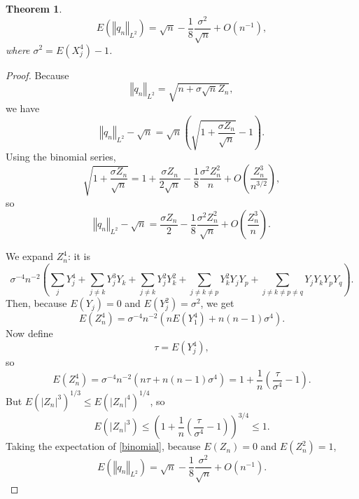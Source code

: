 \documentclass{amsart}
\newcommand{\norm}[1]{\left\Vert #1 \right\Vert}
\newtheorem{theorem}{Theorem}
\begin{document}
\begin{theorem}
\[
E(\norm{q_n}_{L^2}) = \sqrt{n} - \frac{1}{8} \frac{\sigma^2}{\sqrt{n}} + O(n^{-1}),
\]
where $\sigma^2 = E(X_j^4) - 1$.
\end{theorem}
\begin{proof}
Because 
\[
\norm{q_n}_{L^2} = \sqrt{n+\sigma \sqrt{n} Z_n},
\]
we have
\[
\norm{q_n}_{L^2} - \sqrt{n} = \sqrt{n} \left(\sqrt{ 1+\frac{\sigma Z_n}{\sqrt{n}}} - 1 \right).
\]
Using the binomial series,
\[
\sqrt{ 1+\frac{\sigma Z_n}{\sqrt{n}}} =
1+\frac{\sigma Z_n}{2\sqrt{n}} - \frac{1}{8} \frac{\sigma^2 Z_n^2}{n} + O\left(\frac{Z_n^3}{n^{3/2}}\right),
\]
so 
\begin{equation}
\norm{q_n}_{L^2} - \sqrt{n}  = \frac{\sigma Z_n}{2} - \frac{1}{8} \frac{\sigma^2 Z_n^2}{\sqrt{n}} + O \left( \frac{Z_n^3}{n}\right).
\label{binomial}
\end{equation}

We expand $Z_n^4$: it is
\[
\sigma^{-4} n^{-2} \left( \sum_j Y_j^4 + \sum_{j \neq k} Y_j^3 Y_k + \sum_{j \neq k} Y_j^2 Y_k^2
+ \sum_{j \neq k \neq p} Y_k^2 Y_j Y_p
+\sum_{j \neq k \neq p \neq q} Y_jY_kY_pY_q\right). 
\]
Then, because $E(Y_j)=0$ and $E(Y_j^2)=\sigma^2$, we get
\[
E(Z_n^4) = \sigma^{-4} n^{-2} ( nE(Y_1^4) + n(n-1)\sigma^4 ).
\]
Now define
\[
\tau = E(Y_j^4),
\]
so
\[
E(Z_n^4) = \sigma^{-4} n^{-2}(n\tau + n(n-1)\sigma^4)
=1+\frac{1}{n} \left( \frac{\tau}{\sigma^4} -1\right).
\]
But $E(|Z_n|^3)^{1/3} \leq E(|Z_n|^4)^{1/4}$, so
\[
E(|Z_n|^3) \leq \left(1+\frac{1}{n}\left(\frac{\tau}{\sigma^4}-1\right)\right)^{3/4} \leq 1.
\]
Taking the expectation of \eqref{binomial}, because $E(Z_n)=0$ and $E(Z_n^2)=1$,
\[
E(\norm{q_n}_{L^2}) = \sqrt{n} - \frac{1}{8} \frac{\sigma^2}{\sqrt{n}} + O(n^{-1}).
\]
\end{proof}
\end{document}
